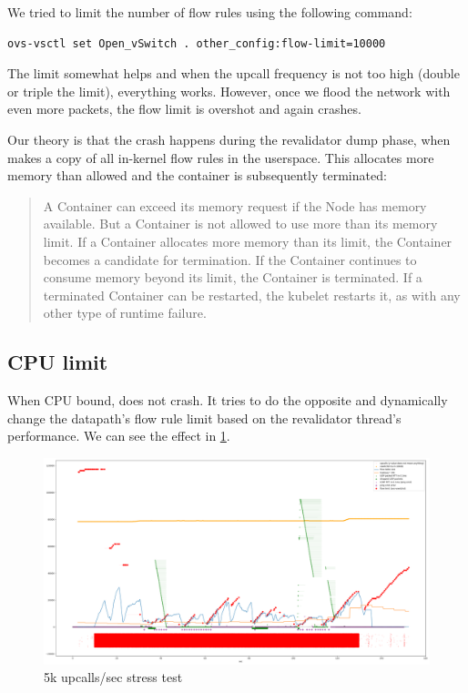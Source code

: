 We tried to limit the number of flow rules using the following command:
\begin{verbatim}
ovs-vsctl set Open_vSwitch . other_config:flow-limit=10000
\end{verbatim}

The limit somewhat helps and when the upcall frequency is not too high (double or triple the limit), everything works. However, once we flood the network with even more packets, the flow limit is overshot and  again crashes.

Our theory is that the crash happens during the revalidator dump phase, when  makes a copy of all in-kernel flow rules in the userspace. This allocates more memory than allowed and the container is subsequently terminated:

\begin{quote}
    A Container can exceed its memory request if the Node has memory available. But a Container is not allowed to use more than its memory limit. If a Container allocates more memory than its limit, the Container becomes a candidate for termination. If the Container continues to consume memory beyond its limit, the Container is terminated. If a terminated Container can be restarted, the kubelet restarts it, as with any other type of runtime failure.
\end{quote}


\subsection{CPU limit}

When CPU bound,  does not crash. It tries to do the opposite and dynamically change the datapath's flow rule limit based on the revalidator thread's performance. We can see the effect in \cref{fig:packet-flood-limited}.

\begin{figure}
    \centering
    \includegraphics[width=.9\linewidth]{img/packet_flood_limited_resources_50k.png}
    \caption{5k upcalls/sec stress test}
    \label{fig:packet-flood-limited}
\end{figure}


